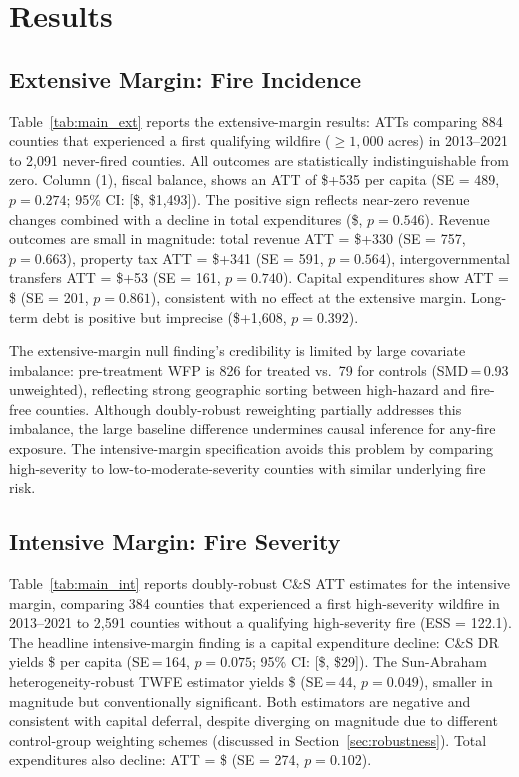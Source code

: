 \documentclass[12pt]{article}
\begin{document}
\section{Results}

\subsection{Extensive Margin: Fire Incidence}

Table~\ref{tab:main_ext} reports the extensive-margin results: ATTs comparing 884
counties that experienced a first qualifying wildfire ($\geq\!1{,}000$ acres) in
2013--2021 to 2,091 never-fired counties. All outcomes are statistically
indistinguishable from zero. Column (1), fiscal balance, shows
an ATT of \$+535 per capita (SE = 489, $p = 0.274$; 95\% CI: [\$, \$1,493]).
The positive sign reflects near-zero revenue changes combined with a decline in
total expenditures (\$, $p = 0.546$). Revenue outcomes are small in
magnitude: total revenue ATT = \$+330 (SE = 757, $p = 0.663$), property tax ATT = \$+341
(SE = 591, $p = 0.564$), intergovernmental transfers ATT = \$+53 (SE = 161, $p = 0.740$).
Capital expenditures show ATT = \$ (SE = 201, $p = 0.861$), consistent with
no effect at the extensive margin. Long-term debt is positive but imprecise
(\$+1,608, $p = 0.392$).

The extensive-margin null finding's credibility is limited by large covariate
imbalance: pre-treatment WFP is 826 for treated vs.\ 79 for controls
(SMD\,=\,0.93 unweighted), reflecting strong geographic sorting between high-hazard
and fire-free counties. Although doubly-robust reweighting partially addresses this
imbalance, the large baseline difference undermines causal inference for any-fire
exposure. The intensive-margin specification avoids this problem by comparing
high-severity to low-to-moderate-severity counties with similar underlying fire risk.

\subsection{Intensive Margin: Fire Severity}

Table~\ref{tab:main_int} reports doubly-robust C\&S ATT estimates for the intensive
margin, comparing 384 counties that experienced a first high-severity wildfire
in 2013--2021 to 2,591 counties without a qualifying high-severity fire (ESS = 122.1).
The headline intensive-margin finding is a capital expenditure decline: C\&S DR
yields \$ per capita (SE\,=\,164, $p = 0.075$; 95\% CI: [\$, \$29]).
The Sun-Abraham heterogeneity-robust TWFE estimator yields \$
(SE\,=\,44, $p = 0.049$), smaller in magnitude but conventionally significant.
Both estimators are negative and consistent with capital deferral, despite diverging
on magnitude due to different control-group weighting schemes (discussed in
Section~\ref{sec:robustness}). Total expenditures also decline:
ATT = \$ (SE = 274, $p = 0.102$).
\end{document}
